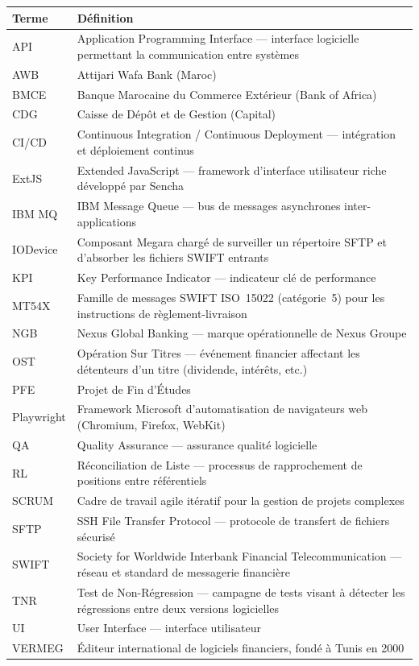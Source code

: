 \documentclass[12pt, a4paper]{report}
\begin{document}
\begin{tabular}{@{}lp{12cm}@{}}
\toprule
\textbf{Terme} & \textbf{Définition} \\
\midrule
API       & Application Programming Interface — interface logicielle permettant la communication entre systèmes \\[3pt]
AWB       & Attijari Wafa Bank (Maroc) \\[3pt]
BMCE      & Banque Marocaine du Commerce Extérieur (Bank of Africa) \\[3pt]
CDG       & Caisse de Dépôt et de Gestion (Capital) \\[3pt]
CI/CD     & Continuous Integration / Continuous Deployment — intégration et déploiement continus \\[3pt]
ExtJS     & Extended JavaScript — framework d'interface utilisateur riche développé par Sencha \\[3pt]
IBM MQ    & IBM Message Queue — bus de messages asynchrones inter-applications \\[3pt]
IODevice  & Composant Megara chargé de surveiller un répertoire SFTP et d'absorber les fichiers SWIFT entrants \\[3pt]
KPI       & Key Performance Indicator — indicateur clé de performance \\[3pt]
MT54X     & Famille de messages SWIFT ISO~15022 (catégorie~5) pour les instructions de règlement-livraison \\[3pt]
NGB       & Nexus Global Banking — marque opérationnelle de Nexus Groupe \\[3pt]
OST       & Opération Sur Titres — événement financier affectant les détenteurs d'un titre (dividende, intérêts, etc.) \\[3pt]
PFE       & Projet de Fin d'Études \\[3pt]
Playwright & Framework Microsoft d'automatisation de navigateurs web (Chromium, Firefox, WebKit) \\[3pt]
QA        & Quality Assurance — assurance qualité logicielle \\[3pt]
RL        & Réconciliation de Liste — processus de rapprochement de positions entre référentiels \\[3pt]
SCRUM     & Cadre de travail agile itératif pour la gestion de projets complexes \\[3pt]
SFTP      & SSH File Transfer Protocol — protocole de transfert de fichiers sécurisé \\[3pt]
SWIFT     & Society for Worldwide Interbank Financial Telecommunication — réseau et standard de messagerie financière \\[3pt]
TNR       & Test de Non-Régression — campagne de tests visant à détecter les régressions entre deux versions logicielles \\[3pt]
UI        & User Interface — interface utilisateur \\[3pt]
VERMEG    & Éditeur international de logiciels financiers, fondé à Tunis en 2000 \\
\bottomrule
\end{tabular}
\end{document}
